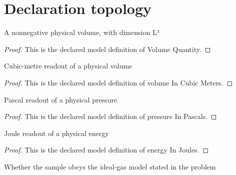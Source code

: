 \section{Declaration topology}
\begin{definition}
  \label{def:physics:phyx-mini-0338:phyxminiproblems-problemphyxmini0338-volumequantity}
  A nonnegative physical volume, with dimension L³
\end{definition}
\begin{proof}
  This is the declared model definition of Volume Quantity.
\end{proof}
\begin{definition}
  \label{def:physics:phyx-mini-0338:phyxminiproblems-problemphyxmini0338-volumeincubicmeters}
  Cubic-metre readout of a physical volume
\end{definition}
\begin{proof}
  This is the declared model definition of volume In Cubic Meters.
\end{proof}
\begin{definition}
  \label{def:physics:phyx-mini-0338:phyxminiproblems-problemphyxmini0338-pressureinpascals}
  Pascal readout of a physical pressure
\end{definition}
\begin{proof}
  This is the declared model definition of pressure In Pascals.
\end{proof}
\begin{definition}
  \label{def:physics:phyx-mini-0338:phyxminiproblems-problemphyxmini0338-energyinjoules}
  Joule readout of a physical energy
\end{definition}
\begin{proof}
  This is the declared model definition of energy In Joules.
\end{proof}
\begin{definition}
  \label{def:physics:phyx-mini-0338:phyxminiproblems-problemphyxmini0338-gasmodel}
  Whether the sample obeys the ideal-gas model stated in the problem
\end{definition}
